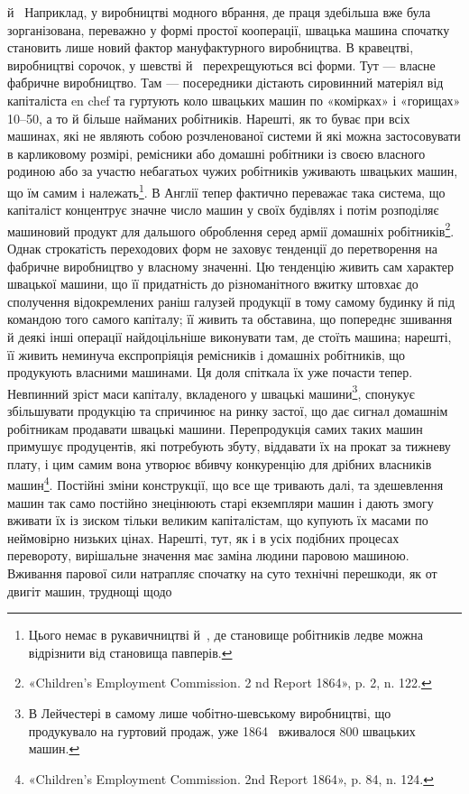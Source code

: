 \parcont{}  %
й~ Наприклад, у виробництві модного вбрання, де праця
здебільша вже була зорганізована, переважно у формі простої
кооперації, швацька машина спочатку становить лише новий
фактор мануфактурного виробництва. В кравецтві, виробництві
сорочок, у шевстві й~ перехрещуються всі форми. Тут —
власне фабричне виробництво. Там — посередники дістають сировинний
матеріял від капіталіста en chef та гуртують коло швацьких
машин по «комірках» і «горищах» 10--50, а то й більше найманих
робітників. Нарешті, як то буває при всіх машинах, які не
являють собою розчленованої системи й які можна застосовувати
в карликовому розмірі, ремісники або домашні робітники із
своєю власного родиною або за участю небагатьох чужих робітників
уживають швацьких машин, що їм самим і належать\footnote{
Цього немає в рукавичництві й~, де становище робітників
ледве можна відрізнити від становища павперів.
}.
В Англії тепер фактично переважає така система, що капіталіст
концентрує значне число машин у своїх будівлях і потім розподіляє
машиновий продукт для дальшого оброблення серед армії
домашніх робітників\footnote{
«Children’s Employment Commission. 2 nd Report 1864», p. 2,
n. 122.
}. Однак строкатість переходових форм
не заховує тенденції до перетворення на фабричне виробництво
у власному значенні. Цю тенденцію живить сам характер швацької
машини, що її придатність до різноманітного вжитку штовхає
до сполучення відокремлених раніш галузей продукції в
тому самому будинку й під командою того самого капіталу; її
живить та обставина, що попереднє зшивання й деякі інші операції
найдоцільніше виконувати там, де стоїть машина; нарешті,
її живить неминуча експропріяція ремісників і домашніх робітників,
що продукують власними машинами. Ця доля спіткала
їх уже почасти тепер. Невпинний зріст маси капіталу, вкладеного
у швацькі машини\footnote{
В Лейчестері в самому лише чобітно-шевському виробництві,
що продукувало на гуртовий продаж, уже 1864~ вживалося 800 швацьких
машин.
}, спонукує збільшувати продукцію та спричинює
на ринку застої, що дає сигнал домашнім робітникам продавати
швацькі машини. Перепродукція самих таких машин примушує
продуцентів, які потребують збуту, віддавати їх на прокат
за тижневу плату, і цим самим вона утворює вбивчу конкуренцію
для дрібних власників машин\footnote{
«Children’s Employment Commission. 2nd Report 1864», p. 84,
n. 124.
}. Постійні зміни конструкції,
що все ще тривають далі, та здешевлення машин так само постійно
знецінюють старі екземпляри машин і дають змогу вживати їх
із зиском тільки великим капіталістам, що купують їх масами
по неймовірно низьких цінах. Нарешті, тут, як і в усіх подібних
процесах перевороту, вирішальне значення має заміна людини
паровою машиною. Вживання парової сили натрапляє спочатку
на суто технічні перешкоди, як от двигіт машин, труднощі щодо
\parbreak{}  %
